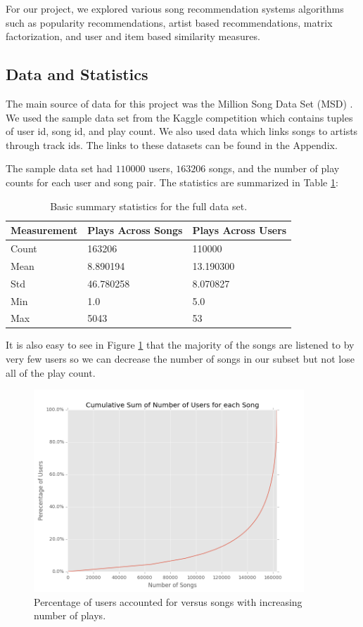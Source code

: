 \documentclass[11pt,preprint]{aastex}
\begin{document}
For our project, we explored various song recommendation systems algorithms such as popularity recommendations, artist based recommendations, matrix factorization, and user and item based similarity measures.  

\subsection{Data and Statistics}
The main source of data for this project was the Million Song Data Set (MSD)  \citep{Bertin-Mahieux2011}. We used the sample data set from the Kaggle competition which contains tuples of user id, song id, and play count. We also used data which links songs to artists through track ids. The links to these datasets can be found in the Appendix.

The sample data set had $110000$ users, $163206$ songs, and the number of play counts for each user and song pair. The statistics are summarized in Table \ref{tab:stats}:

\begin{table}[h]
\begin{center}
\begin{tabular}{lll}
\hline
Measurement & Plays Across Songs & Plays Across Users \\
\hline
Count &  163206 & 110000 \\
Mean  &     8.890194 & 13.190300  \\
Std      &    46.780258 & 8.070827 \\
Min      &    1.0  & 5.0  \\
Max     &   5043 &  53 \\
\end{tabular}
\caption{Basic summary statistics for the full data set.}\label{tab:stats}
\end{center}
\end{table}

It is also easy to see in Figure \ref{fig:csongs} that the majority of the songs are listened to by very few users so we can decrease the number of songs in our subset but not lose all of the play count. 

\begin{figure}[H] %
   \centering
   \includegraphics[width=4in]{../plots/final/cumsum-songs.png} 
   \caption{Percentage of users accounted for versus songs with increasing number of plays.}\label{fig:csongs}
\end{figure}
\end{document}
